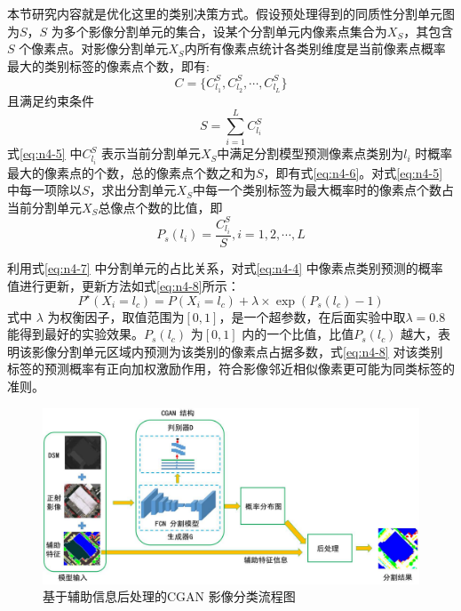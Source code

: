 本节研究内容就是优化这里的类别决策方式。假设预处理得到的同质性分割单元图为$S$，$S$ 为多个影像分割单元的集合，设某个分割单元内像素点集合为$X_S$，其包含$S$ 个像素点。对影像分割单元$X_S$内所有像素点统计各类别维度是当前像素点概率最大的类别标签的像素点个数，即有:
\begin{equation}\label{eq:n4-5}
    C = \{C^S_{l_1},C^S_{l_2}, \cdots, C^S_{l_L}\}
\end{equation}
且满足约束条件
\begin{equation}\label{eq:n4-6}
    S  = \sum _{i = 1}^L C^S_{l_i}
\end{equation}
式\ref{eq:n4-5} 中$C^S_{l_i}$ 表示当前分割单元$X_S$中满足分割模型预测像素点类别为$l_i$ 时概率最大的像素点的个数，总的像素点个数之和为$S$，即有式\ref{eq:n4-6}。对式\ref{eq:n4-5} 中每一项除以$S$，求出分割单元$X_S$中每一个类别标签为最大概率时的像素点个数占当前分割单元$X_S$总像点个数的比值，即
\begin{equation}\label{eq:n4-7}
    P_s(l_i) = \frac{C^S_{l_i}}{S},i=1,2,\cdots,L
\end{equation}

利用式\ref{eq:n4-7} 中分割单元的占比关系，对式\ref{eq:n4-4} 中像素点类别预测的概率值进行更新，更新方法如式\ref{eq:n4-8}所示：
\begin{equation}\label{eq:n4-8}
    P^{\star}(X_i=l_c) =  P(X_i=l_c) + \lambda \times \exp{(P_s(l_c)-1)}
\end{equation}
式中 $\lambda$ 为权衡因子，取值范围为$[0,1]$，是一个超参数，在后面实验中取$\lambda=0.8$ 能得到最好的实验效果。$P_s(l_c)$ 为$[0,1]$ 内的一个比值，比值$P_s(l_c)$ 越大，表明该影像分割单元区域内预测为该类别的像素点占据多数，式\ref{eq:n4-8} 对该类别标签的预测概率有正向加权激励作用，符合影像邻近相似像素更可能为同类标签的准则。


\begin{figure}[htbp]
    \centering
    \includegraphics[width=1.0\textwidth]{figures/cgan_post}
    \caption{基于辅助信息后处理的CGAN 影像分类流程图 }\label{fig:cgan_post}
\end{figure}

